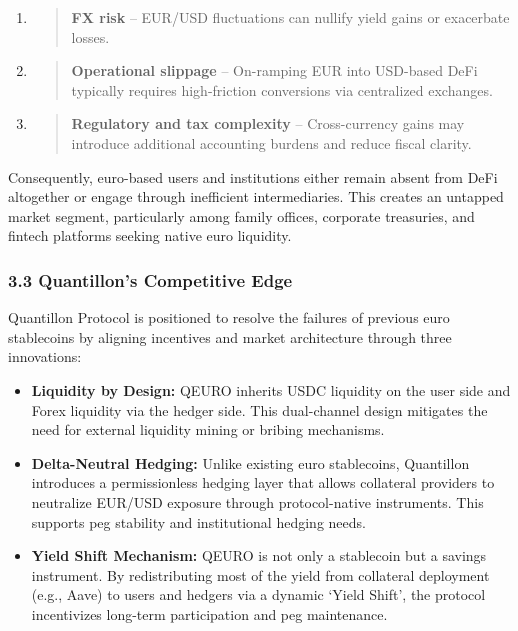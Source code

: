 \begin{enumerate}
\def\labelenumi{\arabic{enumi}.}
\item
  \begin{quote}
  \textbf{FX risk} -- EUR/USD fluctuations can nullify yield gains or
  exacerbate losses.
  \end{quote}
\item
  \begin{quote}
  \textbf{Operational slippage} -- On-ramping EUR into USD-based DeFi
  typically requires high-friction conversions via centralized
  exchanges.
  \end{quote}
\item
  \begin{quote}
  \textbf{Regulatory and tax complexity} -- Cross-currency gains may
  introduce additional accounting burdens and reduce fiscal clarity.
  \end{quote}
\end{enumerate}

Consequently, euro-based users and institutions either remain absent
from DeFi altogether or engage through inefficient intermediaries. This
creates an untapped market segment, particularly among family offices,
corporate treasuries, and fintech platforms seeking native euro
liquidity.

\hypertarget{quantillons-competitive-edge}{%
\subsubsection{3.3 Quantillon's Competitive
Edge}\label{quantillons-competitive-edge}}

Quantillon Protocol is positioned to resolve the failures of previous
euro stablecoins by aligning incentives and market architecture through
three innovations:

\begin{itemize}
\item
  \textbf{Liquidity by Design:} QEURO inherits USDC liquidity on the
  user side and Forex liquidity via the hedger side. This dual-channel
  design mitigates the need for external liquidity mining or bribing
  mechanisms.
\item
  \textbf{Delta-Neutral Hedging:} Unlike existing euro stablecoins,
  Quantillon introduces a permissionless hedging layer that allows
  collateral providers to neutralize EUR/USD exposure through
  protocol-native instruments. This supports peg stability and
  institutional hedging needs.
\item
  \textbf{Yield Shift Mechanism:} QEURO is not only a stablecoin but a
  savings instrument. By redistributing most of the yield from
  collateral deployment (e.g., Aave) to users and hedgers via a dynamic
  `Yield Shift', the protocol incentivizes long-term participation and
  peg maintenance.
\end{itemize}

